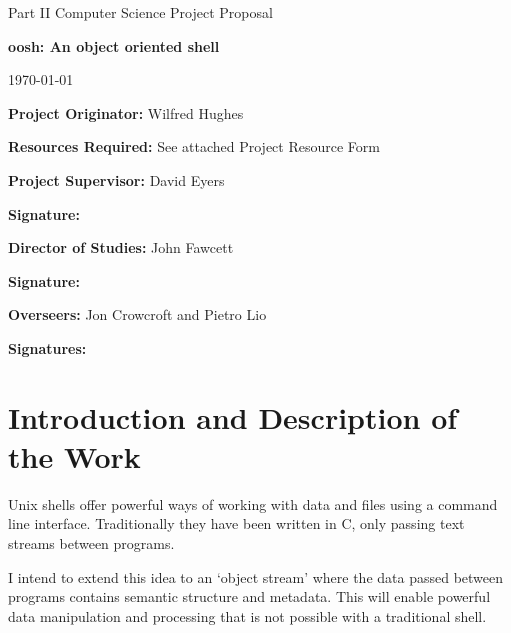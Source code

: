 \documentclass[12pt]{article}
\begin{document}
\thispagestyle{empty}

\medskip
{}
\medskip
{}

\vfil

\centerline{\large Part II Computer Science Project Proposal}
\vspace{0.4in}
\centerline{\Large\bf oosh: An object oriented shell}
\vspace{0.3in}
\centerline{\large \today}

\vfil

{\bf Project Originator:} Wilfred Hughes

\vspace{0.1in}

{\bf Resources Required:} See attached Project Resource Form

\vspace{0.5in}

{\bf Project Supervisor:} David Eyers

\vspace{0.2in}

{\bf Signature:}

\vspace{0.5in}

{\bf Director of Studies:}  John Fawcett

\vspace{0.2in}

{\bf Signature:}

\vspace{0.5in}

{\bf Overseers:} Jon Crowcroft and Pietro Lio

\vspace{0.2in}

{\bf Signatures:}

\vfil
\eject

\section*{Introduction and Description of the Work}
Unix shells offer powerful ways of working with data and files using a
command line interface. Traditionally they have been written in C,
only passing text streams between programs.

I intend to extend this idea to an `object stream' where the data
passed between programs contains semantic structure and metadata. This
will enable powerful data manipulation and processing that is not
possible with a traditional shell.
\end{document}
